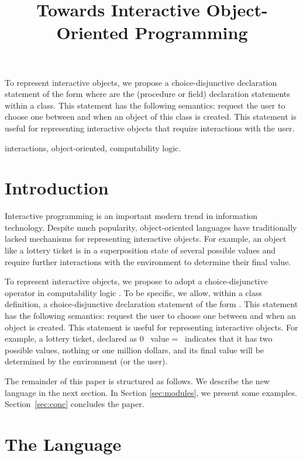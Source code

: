 \documentclass[letter]{ieice}
\title{Towards Interactive Object-Oriented Programming}
\newcommand{\add}{\sqcup} \newcommand{\adc}{\&} \newcommand{\Cscr}{{\cal C}}
\begin{document}
\maketitle
\begin{summary}
To represent interactive objects,  we propose
 a choice-disjunctive declaration statement of the form
 where  are the (procedure or field) declaration statements within
 a class.
This statement has the
following semantics: request the user to choose one between  and  when an
object of this class is created.
  This statement is useful for representing interactive objects that require
interactions with the user.
\end{summary}
\begin{keywords}
interactions, object-oriented, computability logic.
\end{keywords}


\section{Introduction}\label{sec:intro}

Interactive  programming \cite{Lyn96,Rol10} is an important modern trend in information technology.
 Despite much popularity, object-oriented languages \cite{Avi03,Jos12,Jos08} have
traditionally lacked mechanisms  for representing interactive objects.
For example, an object like a lottery ticket is in a superposition state of
several possible values and require further interactions with the environment to determine
their final value.

To represent interactive objects,  we propose to adopt a choice-disjunctive
operator in computability logic \cite{Jap03,Jap08}. To be specific,
we allow, within a class definition,
 a choice-disjunctive declaration statement of the form
.
This statement has the
following semantics: request the user to choose one between   and  when
an object is created.
  This statement  is useful for representing interactive objects. For example,
a lottery ticket, declared as 0 \add\ value = \, indicates that it
has two possible values, nothing or one million dollars, and its final value will
be determined by the environment (or the user).




The remainder of this paper is structured as follows. We describe the new language 
 in
the next section. In Section \ref{sec:modules}, we
present some examples.
Section~\ref{sec:conc} concludes the paper.


\section{The Language}\label{sec:logic}
\end{document}

